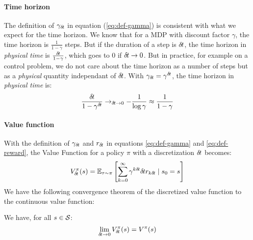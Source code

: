 




\paragraph{Time horizon} The definition of $\gamma_{\delta\hspace{-.1em}t}$ in equation (\ref{eq:def-gamma}) is consistent with what we expect for the time horizon. We know  that for a MDP with discount factor $\gamma$, the time horizon is $\frac{1}{1-\gamma}$ steps. But if the duration of a step is ${\delta\hspace{-.1em}t}$, the time horizon in \emph{physical time} is $\frac{{\delta\hspace{-.1em}t}}{1-\gamma}$, which goes to 0 if ${\delta\hspace{-.1em}t} \rightarrow 0$.
But in practice, for example on a control problem, we do not care about the time horizon as a number of steps but as a \emph{physical} quantity independant of ${\delta\hspace{-.1em}t}$. With $\gamma_{\delta\hspace{-.1em}t} = \gamma^{\delta\hspace{-.1em}t}$, the time horizon in \emph{physical time} is:
\begin{equation}
  \label{eq:time-horizon}
  \frac{{\delta\hspace{-.1em}t}}{1-\gamma^{\delta\hspace{-.1em}t}} \rightarrow_{{\delta\hspace{-.1em}t} \rightarrow 0} - \frac{1}{\log \gamma} \approx \frac{1}{1-\gamma}
\end{equation}


\paragraph{Value function}

With the definition of $\gamma_{\delta\hspace{-.1em}t}$ and $r_{\delta\hspace{-.1em}t}$ in equations \eqref{eq:def-gamma} and \eqref{eq:def-reward}, the Value Function for a policy $\pi$ with a discretization ${\delta\hspace{-.1em}t}$ becomes:
\begin{equation}
  V^\pi_{\delta\hspace{-.1em}t}(s) = \mathbb{E}_{\tau\sim\pi}\left[\sum\limits_{k=0}^\infty \gamma^{k{\delta\hspace{-.1em}t}}{\delta\hspace{-.1em}t} r_{k{\delta\hspace{-.1em}t}} \mid s_0 = s\right]
\end{equation}
We have the following convergence theorem of the discretized value function to the continuous value function:
  \begin{theorem}
    We have, for all $s \in {\cal S}$:
    \begin{equation}
      \label{eq:conv-value}
      \lim_{{\delta\hspace{-.1em}t} \rightarrow 0} V^\pi_{\delta\hspace{-.1em}t}(s) = V^\pi(s)
    \end{equation}
  \end{theorem}

